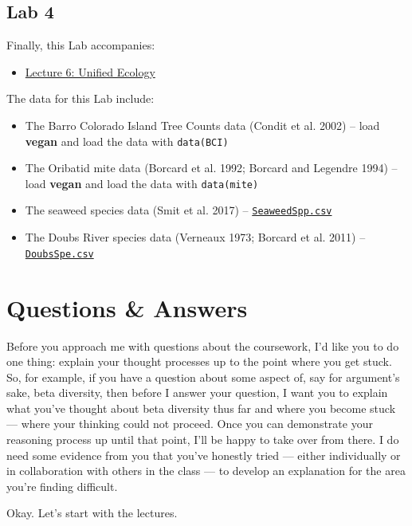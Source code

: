 \documentclass[
  11pt,
]{book}
\providecommand{\tightlist}{%
  \setlength{\itemsep}{0pt}\setlength{\parskip}{0pt}}
\let\oldtexttt\texttt
\renewcommand{\texttt}[1]{\oldtexttt{\small #1}}
\begin{document}
\subsection{Lab 4}\label{lab-4}

Finally, this Lab accompanies:

\begin{itemize}
\tightlist
\item
  \href{Lec-06-unified-ecology.html}{Lecture 6: Unified Ecology}
\end{itemize}

The data for this Lab include:

\begin{itemize}
\tightlist
\item
  The Barro Colorado Island Tree Counts data (Condit et al. 2002) --
  load \textbf{vegan} and load the data with \texttt{data(BCI)}
\item
  The Oribatid mite data (Borcard et al. 1992; Borcard and Legendre
  1994) -- load \textbf{vegan} and load the data with
  \texttt{data(mite)}
\item
  The seaweed species data (Smit et al. 2017) --
  \href{../data/seaweed/SeaweedSpp.csv}{\texttt{SeaweedSpp.csv}}
\item
  The Doubs River species data (Verneaux 1973; Borcard et al. 2011) --
  \href{../data/DoubsSpe.csv}{\texttt{DoubsSpe.csv}}
\end{itemize}

\section{Questions \& Answers}\label{questions-answers}

Before you approach me with questions about the coursework, I'd like you
to do one thing: explain your thought processes up to the point where
you get stuck. So, for example, if you have a question about some aspect
of, say for argument's sake, beta diversity, then before I answer your
question, I want you to explain what you've thought about beta diversity
thus far and where you become stuck --- where your thinking could not
proceed. Once you can demonstrate your reasoning process up until that
point, I'll be happy to take over from there. I do need some evidence
from you that you've honestly tried --- either individually or in
collaboration with others in the class --- to develop an explanation for
the area you're finding difficult.

Okay. Let's start with the lectures.
\end{document}
